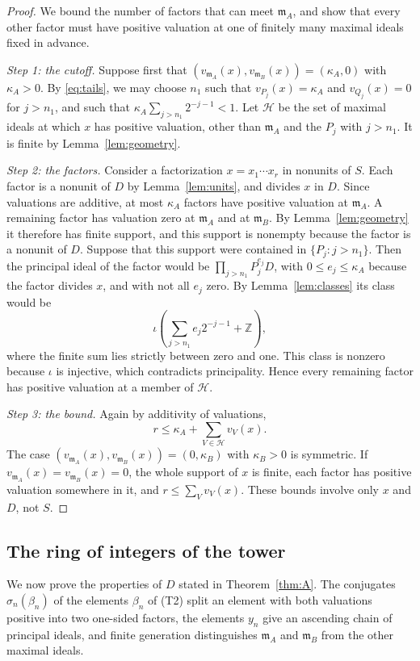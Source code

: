 \documentclass[11pt]{article}
\theoremstyle{plain}
\theoremstyle{definition}
\theoremstyle{remark}
\newcommand{\Z}{\mathbb Z}
\newcommand{\EA}{\mathfrak m_A}
\newcommand{\EB}{\mathfrak m_B}
\begin{document}
\begin{proof}
We bound the number of factors that can meet $\EA$, and show that every
other factor must have positive valuation at one of finitely many
maximal ideals fixed in advance.

\emph{Step 1: the cutoff.}  Suppose first that
$(v_{\EA}(x),v_{\EB}(x))=(\kappa_A,0)$ with $\kappa_A>0$.  By
\eqref{eq:tails}, we may choose $n_1$ such that $v_{P_j}(x)=\kappa_A$ and
$v_{Q_j}(x)=0$ for $j>n_1$, and such that
$\kappa_A\sum_{j>n_1}2^{-j-1}<1$.  Let $\mathcal H$ be the set of maximal
ideals at which $x$ has positive valuation, other than $\EA$ and the
$P_j$ with $j>n_1$.  It is finite by Lemma~\ref{lem:geometry}.

\emph{Step 2: the factors.}  Consider a factorization $x=x_1\cdots x_r$ in
nonunits of $S$.  Each factor is a nonunit of $D$ by
Lemma~\ref{lem:units}, and divides $x$ in $D$.  Since valuations are
additive, at most $\kappa_A$ factors have positive valuation at $\EA$.  A
remaining factor has valuation zero at $\EA$ and at $\EB$.  By
Lemma~\ref{lem:geometry} it therefore has finite support, and this
support is nonempty because the factor is a nonunit of $D$.  Suppose that
this support were contained in $\{P_j:j>n_1\}$.  Then the principal ideal
of the factor would be $\prod_{j>n_1}P_j^{e_j}D$, with
$0\leq e_j\leq\kappa_A$ because the factor divides $x$, and with not all
$e_j$ zero.  By Lemma~\ref{lem:classes} its class would be
\[
 \iota\left(\sum_{j>n_1}e_j2^{-j-1}+\Z\right),
\]
where the finite sum lies strictly between zero and one.  This class is
nonzero because $\iota$ is injective, which contradicts principality.
Hence every remaining factor has positive valuation at a member of
$\mathcal H$.

\emph{Step 3: the bound.}  Again by additivity of valuations,
\[
 r\leq \kappa_A+\sum_{V\in\mathcal H}v_V(x).
\]
The case $(v_{\EA}(x),v_{\EB}(x))=(0,\kappa_B)$ with $\kappa_B>0$ is
symmetric.  If $v_{\EA}(x)=v_{\EB}(x)=0$, the whole support of $x$ is
finite, each factor has positive valuation somewhere in it, and
$r\leq\sum_Vv_V(x)$.  These bounds involve only $x$ and $D$, not $S$.
\end{proof}

\subsection{The ring of integers of the tower}\label{sec:ambient}

We now prove the properties of $D$ stated in Theorem~\ref{thm:A}.  The
conjugates $\sigma_n(\beta_n)$ of the elements $\beta_n$ of (T2) split an element with both valuations positive
into two one-sided factors, the elements $y_n$ give an ascending chain of
principal ideals, and finite generation distinguishes $\EA$ and $\EB$ from
the other maximal ideals.
\end{document}
